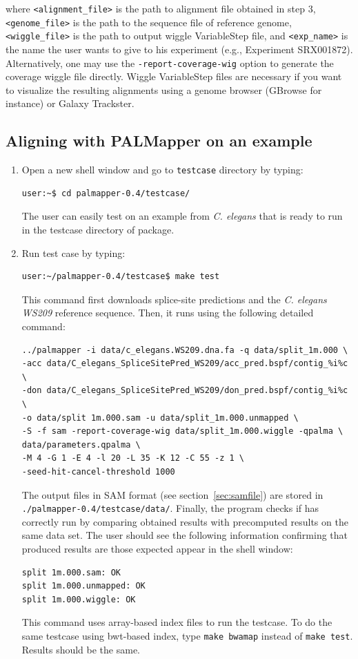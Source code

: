 \documentclass{article}
\begin{document}
\begin{enumerate}
where \texttt{<alignment\_file>} is the path to alignment file
obtained in step 3, \texttt{<genome\_file>} is the path to the
sequence file of reference genome, \texttt{<wiggle\_file>} is the path
to output wiggle VariableStep file, and \texttt{<exp\_name>} is the
name the user wants to give to his experiment (e.g., Experiment
SRX001872). Alternatively, one may use the
\texttt{-report-coverage-wig} option to generate the coverage wiggle
file directly. Wiggle VariableStep files are necessary if you want to
visualize the resulting alignments using a genome browser (GBrowse for
instance) or Galaxy Trackster.  
\end{enumerate}


\subsection{Aligning with PALMapper on an example}
\label{sec:example}

\begin{enumerate}
\item Open a new shell window and go to \texttt{testcase} directory by
  typing: 
\begin{verbatim}
user:~$ cd palmapper-0.4/testcase/
\end{verbatim}
The user can easily test \PALMapper{} on an example from
\emph{C. elegans} that is ready to run in the testcase directory of
\PALMapper{} package.
\item Run test case by typing:
\begin{verbatim}
user:~/palmapper-0.4/testcase$ make test
\end{verbatim}
This command first downloads splice-site predictions and the
\emph{C. elegans WS209} reference sequence. Then, it runs \PALMapper{}
using the following detailed command:
\begin{verbatim}
../palmapper -i data/c_elegans.WS209.dna.fa -q data/split_1m.000 \
-acc data/C_elegans_SpliceSitePred_WS209/acc_pred.bspf/contig_%i%c \
-don data/C_elegans_SpliceSitePred_WS209/don_pred.bspf/contig_%i%c \
-o data/split 1m.000.sam -u data/split_1m.000.unmapped \
-S -f sam -report-coverage-wig data/split_1m.000.wiggle -qpalma \
data/parameters.qpalma \
-M 4 -G 1 -E 4 -l 20 -L 35 -K 12 -C 55 -z 1 \
-seed-hit-cancel-threshold 1000
\end{verbatim}
The output files in SAM format (see section~\ref{sec:samfile}) are
stored in \texttt{./palmapper-0.4/testcase/data/}. Finally, the
program checks if \PALMapper{} has correctly run by comparing obtained
results with precomputed results on the same data set. The user should
see the following information confirming that produced results are
those expected appear in the shell window: 

\begin{verbatim}
split 1m.000.sam: OK
split 1m.000.unmapped: OK
split 1m.000.wiggle: OK
\end{verbatim}

This command uses array-based index files to run the testcase. To do
the same testcase using bwt-based index, type \texttt{make bwamap}
instead of \texttt{make test}. Results should be the same.
\end{enumerate}
\end{document}
